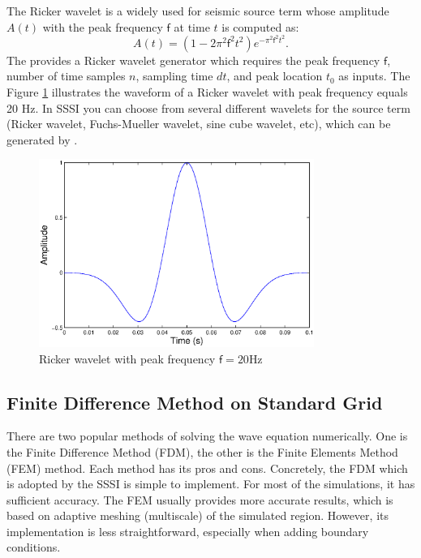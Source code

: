 \documentclass[11pt]{article}
\newcommand{\sff}{\mathsf{f}}
\theoremstyle{plain}
\theoremstyle{definition}
\theoremstyle{remark}
\numberwithin{equation}{section}
\begin{document}
The Ricker wavelet is a widely used for seismic source term whose amplitude $A(t)$ with the peak frequency $\sff$ at time $t$ is computed 
as:
\begin{equation}
A(t)=(1-2\pi^2 \sff^2 t^2)e^{-\pi^2 \sff^2 t^2}.
\end{equation}
The  provides a Ricker wavelet generator which requires the peak frequency $\sff$, number of time samples $n$, 
sampling time $dt$, and peak location $t_0$ as inputs. The Figure \ref{fig:ricker} illustrates the waveform of a Ricker wavelet with peak frequency equals 20 Hz. In SSSI you can choose from several different wavelets for the source term (Ricker wavelet, Fuchs-Mueller wavelet, sine cube wavelet, etc), which can be generated by .

\begin{figure}[htbp]
\centering
\includegraphics[width=0.8\textwidth]{Fig/ricker}
\caption{Ricker wavelet with peak frequency $\sff=20$Hz}
\label{fig:ricker}
\end{figure}


\subsection{Finite Difference Method on Standard Grid}
There are two popular methods of solving the wave equation numerically. One is the Finite Difference Method (FDM), the other is the Finite Elements Method (FEM) method. Each method has its pros and cons. Concretely, the FDM which is adopted by the SSSI is simple to implement. For most of the simulations, it has sufficient accuracy. The FEM usually provides more accurate results, which is based on adaptive meshing (multiscale) of the simulated region. However, its implementation is less straightforward, especially when adding boundary conditions.   
\end{document}
